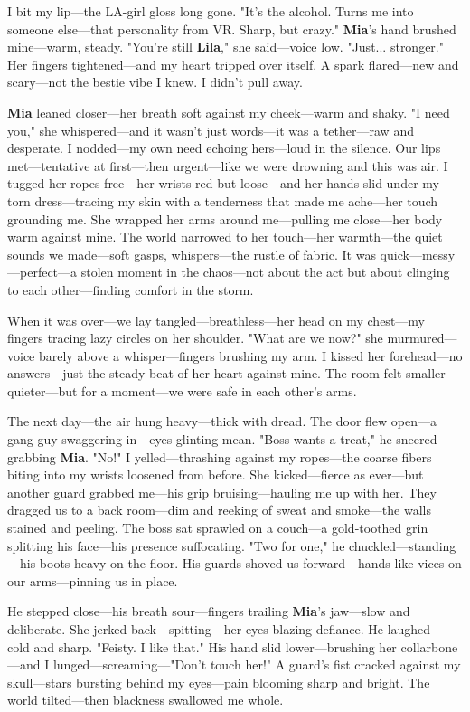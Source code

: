 \documentclass{article}
\begin{document}
I bit my lip—the LA-girl gloss long gone. "It’s the alcohol. Turns me into someone else—that personality from VR. Sharp, but crazy." \textbf{Mia}’s hand brushed mine—warm, steady. "You’re still \textbf{Lila}," she said—voice low. "Just... stronger." Her fingers tightened—and my heart tripped over itself. A spark flared—new and scary—not the bestie vibe I knew. I didn’t pull away.

\textbf{Mia} leaned closer—her breath soft against my cheek—warm and shaky. "I need you," she whispered—and it wasn’t just words—it was a tether—raw and desperate. I nodded—my own need echoing hers—loud in the silence. Our lips met—tentative at first—then urgent—like we were drowning and this was air. I tugged her ropes free—her wrists red but loose—and her hands slid under my torn dress—tracing my skin with a tenderness that made me ache—her touch grounding me. She wrapped her arms around me—pulling me close—her body warm against mine. The world narrowed to her touch—her warmth—the quiet sounds we made—soft gasps, whispers—the rustle of fabric. It was quick—messy—perfect—a stolen moment in the chaos—not about the act but about clinging to each other—finding comfort in the storm.

When it was over—we lay tangled—breathless—her head on my chest—my fingers tracing lazy circles on her shoulder. "What are we now?" she murmured—voice barely above a whisper—fingers brushing my arm. I kissed her forehead—no answers—just the steady beat of her heart against mine. The room felt smaller—quieter—but for a moment—we were safe in each other’s arms.

The next day—the air hung heavy—thick with dread. The door flew open—a gang guy swaggering in—eyes glinting mean. "Boss wants a treat," he sneered—grabbing \textbf{Mia}. "No!" I yelled—thrashing against my ropes—the coarse fibers biting into my wrists loosened from before. She kicked—fierce as ever—but another guard grabbed me—his grip bruising—hauling me up with her. They dragged us to a back room—dim and reeking of sweat and smoke—the walls stained and peeling. The boss sat sprawled on a couch—a gold-toothed grin splitting his face—his presence suffocating. "Two for one," he chuckled—standing—his boots heavy on the floor. His guards shoved us forward—hands like vices on our arms—pinning us in place.

He stepped close—his breath sour—fingers trailing \textbf{Mia}’s jaw—slow and deliberate. She jerked back—spitting—her eyes blazing defiance. He laughed—cold and sharp. "Feisty. I like that." His hand slid lower—brushing her collarbone—and I lunged—screaming—"Don’t touch her!" A guard’s fist cracked against my skull—stars bursting behind my eyes—pain blooming sharp and bright. The world tilted—then blackness swallowed me whole.
\end{document}
